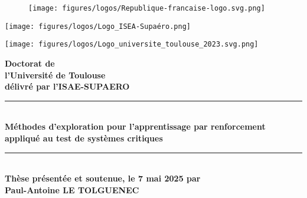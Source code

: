 \documentclass[a4paper,12pt]{article}
\begin{document}
\begin{figure}[!ht]
    \hspace{-3cm}  %
    \texttt{[image: figures/logos/Republique-francaise-logo.svg.png]}
\end{figure}

\begin{flushright}
    \begin{minipage}{0.45\textwidth}
        \texttt{[image: figures/logos/Logo\_ISEA-Supaéro.png]}
    \end{minipage} \hspace{0.5cm}
    \begin{minipage}{0.45\textwidth}
        \texttt{[image: figures/logos/Logo\_universite\_toulouse\_2023.svg.png]}
    \end{minipage}
\end{flushright}

\begin{flushright}
    \textbf{\huge Doctorat de\\ l'Université de Toulouse} \\[0.5cm]
    \textbf{\large délivré par l'ISAE-SUPAERO} \\[2cm]
    
    \noindent\rule{8cm}{0.4pt}  %
    \\[0.5cm]
    \textbf{\large Méthodes d'exploration pour l'apprentissage par renforcement appliqué au test de systèmes critiques} \\[1.5cm]
    \noindent\rule{8cm}{0.4pt}  %
    \\[1.5cm]
    
    \textbf{\Large Thèse présentée et soutenue, le 7 mai 2025 par} \\[0.5cm]
    
    {\huge \textbf{Paul-Antoine LE TOLGUENEC}} \\[2cm]
\end{flushright}
\end{document}

